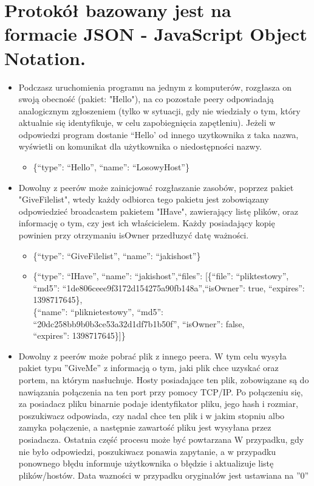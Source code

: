 \documentclass[10pt,a4paper]{article}
\begin{document}
\section{Protokół bazowany jest na formacie JSON - JavaScript Object Notation.}
\begin{itemize}
\item Podczasz uruchomienia programu na jednym z komputerów, rozgłasza on swoją obecność (pakiet: "Hello"), na co pozostałe peery odpowiadają analogicznym zgłoszeniem (tylko w sytuacji, gdy nie wiedziały o tym, który aktualnie się identyfikuje, w celu zapobiegnięcia zapętleniu). Jeżeli w odpowiedzi program dostanie “Hello’ od innego uzytkownika z taka nazwa, wyświetli on komunikat dla użytkownika o niedostępności nazwy.
\renewcommand{\labelitemii}{$\circ$}
\begin{itemize}
\item \{“type”: “Hello”, “name”: “LosowyHost”\}
\end{itemize}
\item Dowolny z peerów może zainicjować rozgłaszanie zasobów, poprzez pakiet "GiveFilelist", wtedy każdy odbiorca tego pakietu jest zobowiązany odpowiedzieć broadcastem pakietem "IHave", zawierający listę plików, oraz informację o tym, czy jest ich właścicielem. Każdy posiadający kopię powinien przy otrzymaniu isOwner przedłuzyć datę ważności.
\begin{itemize}
\item \{“type”: “GiveFilelist”, “name”: “jakishost”\}
\item \{“type”: “IHave”, “name”: “jakishost”,“files”: [\{“file”: “pliktestowy”, 
\\“md5”: “1de806ceee9f3172d154275a90fb148a”,“isOwner”: true, “expires”: 1398717645\}, 
\\\{“name”: “pliknietestowy”, “md5”: “20dc258bb9b0b3ce53a32d1df7b1b50f”, “isOwner”: false, 
\\“expires”: 1398717645\}]\}
\end{itemize}
\item Dowolny z peerów może pobrać plik z innego peera. W tym celu wysyła pakiet typu ''GiveMe'' z informacją o tym, jaki plik chce uzyskać oraz portem, na którym nasłuchuje. Hosty posiadające ten plik, zobowiązane są do nawiązania połączenia na ten port przy pomocy TCP/IP. Po połączeniu się, za posiadacz pliku binarnie podaje identyfikator pliku, jego hash i rozmiar, poszukiwacz odpowiada, czy nadal chce ten plik i w jakim stopniu albo zamyka połączenie, a następnie zawartość pliku jest wysyłana przez posiadacza. Ostatnia część procesu może być powtarzana W przypadku, gdy nie było odpowiedzi, poszukiwacz ponawia zapytanie, a w przypadku ponownego błędu informuje użytkownika o błędzie i aktualizuje listę plików/hostów. Data wazności w przypadku oryginałów jest ustawiana na ''0''

\end{itemize}
\end{document}
